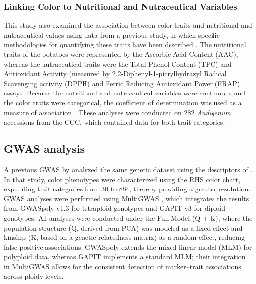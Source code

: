 \documentclass[pdflatex,sn-mathphys-ay]{sn-jnl}%
\begin{document}
\subsubsection{Linking Color to Nutritional and Nutraceutical Variables}

This study also examined the association between color traits and nutritional and nutraceutical values using data from a previous study, in which specific methodologies for quantifying these traits have been described \citep{berdugo2023phenotypic}. The nutritional traits of the potatoes were represented by the Ascorbic Acid Content (AAC), whereas the nutraceutical traits were the Total Phenol Content (TPC) and Antioxidant Activity (measured by 2.2-Diphenyl-1-picrylhydrazyl Radical Scavenging activity (DPPH) and Ferric Reducing Antioxidant Power (FRAP) assays.
Because the nutritional and nutraceutical variables were continuous and the color traits were categorical, the coefficient of determination was used as a measure of association \citep{nagelkerke1991note}. These analyses were conducted on 282 \textit{Andigenum} accessions from the CCC, which contained data for both trait categories.


\subsection{GWAS analysis \label{subsec:GWAS-process} }





A previous GWAS by \cite{Berdugo2017} analyzed the same genetic dataset using the descriptors of \cite{gomez2000guia}. In that study, color phenotypes were characterized using the RHS color chart, expanding trait categories from 30 to 884, thereby providing a greater resolution. GWAS analyses were performed using MultiGWAS \citep{Garreta2021}, which integrates the results from GWASpoly v1.3 \citep{Rosyara2016} for tetraploid genotypes and GAPIT v3 \citep{Tan2016} for diploid genotypes. All analyses were conducted under the Full Model (Q + K), where the population structure (Q, derived from PCA) was modeled as a fixed effect and kinship (K, based on a genetic relatedness matrix) as a random effect, reducing false-positive associations. GWASpoly \citep{Rosyara2016} extends the mixed linear model (MLM) for polyploid data, whereas GAPIT \citep{Tan2016} implements a standard MLM; their integration in MultiGWAS allows for the consistent detection of marker–trait associations across ploidy levels.
\end{document}
